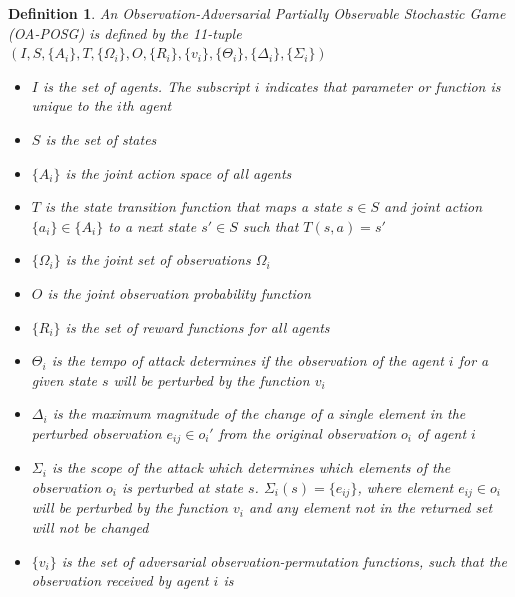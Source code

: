\documentclass[conference,compsoc]{IEEEtran}
\newtheorem{definition}{Definition}
\begin{document}
\begin{definition}
An Observation-Adversarial Partially Observable Stochastic Game (OA-POSG) is defined by the 11-tuple $(I, S, \{A_i\}, T, \{\Omega_i\}, O, \{R_i\}, \{v_i\}, \{\Theta_i\}, \{\Delta_i\}, \{\Sigma_i\})$
\begin{itemize}
    \item $I$ is the set of agents. The subscript $i$ indicates that parameter or function is unique to the $i$th agent
    \item $S$ is the set of states
    \item $\{A_i\}$ is the joint action space of all agents
    \item $T$ is the state transition function that maps a state $s \in S$ and joint action $\{a_i\} \in \{A_i\}$ to a next state $s' \in S$ such that $T(s, a) = s'$
    \item $\{\Omega_i\}$ is the joint set of observations $\Omega_i$
    \item $O$ is the joint observation probability function
    \item $\{R_i\}$ is the set of reward functions for all agents
    \item $\Theta_i$ is the tempo of attack determines if the observation of the agent $i$ for a given state $s$ will be perturbed by the function $v_i$
    \item $\Delta_i$ is the maximum magnitude of the change of a single element in the perturbed observation  $e_{ij} \in o_i'$ from the original observation $o_i$ of agent $i$
    \item $\Sigma_i$ is the scope of the attack which determines which elements of the observation $o_i$ is perturbed at state $s$. $\Sigma_i(s) = \{e_{ij}\}$, where element $e_{ij} \in o_i$ will be perturbed by the function $v_i$ and any element not in the returned set will not be changed
    \item $\{v_i\}$ is the set of adversarial observation-permutation functions, such that the observation received by agent $i$ is
    

\end{itemize}
\end{definition}
\end{document}
